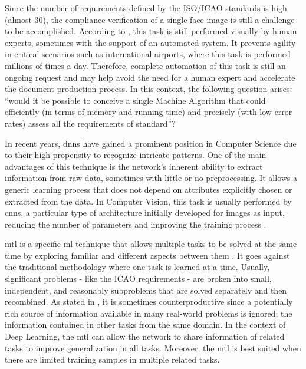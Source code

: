 Since the number of requirements defined by the ISO/ICAO standards is high (almost 30), the compliance verification of a single face image is still a challenge to be accomplished. According to \cite{ferrara2012multi}, this task is still performed visually by human experts, sometimes with the support of an automated system. It prevents agility in critical scenarios such as international airports, where this task is performed millions of times a day. Therefore, complete automation of this task is still an ongoing request and may help avoid the need for a human expert and accelerate the document production process. In this context, the following question arises: ``would it be possible to conceive a single Machine Algorithm that could efficiently (in terms of memory and running time) and precisely (with low error rates) assess all the requirements of \icao standard''?

In recent years, \acfp{dnn} have gained a prominent position in Computer Science due to their high propensity to recognize intricate patterns. One of the main advantages of this technique is the network's inherent ability to extract information from raw data, sometimes with little or no preprocessing. It allows a generic learning process that does not depend on attributes explicitly chosen or extracted from the data. In Computer Vision, this task is usually performed by \acfp{cnn}, a particular type of architecture initially developed for images as input, reducing the number of parameters and improving the training process \citep{goodfellow2016deep}.

\acf{mtl} is a specific \acl{ml} technique that allows multiple tasks to be solved at the same time by exploring familiar and different aspects between them \citep{zhang2017survey}. It goes against the traditional methodology where one task is learned at a time. Usually, significant problems - like the ICAO requirements - are broken into small, independent, and reasonably subproblems that are solved separately and then recombined. As stated in \cite{Caruana1997}, it is sometimes counterproductive since a potentially rich source of information available in many real-world problems is ignored: the information contained in other tasks from the same domain. In the context of Deep Learning, the \acs{mtl} can allow the network to share information of related tasks to improve generalization in all tasks. Moreover, the \acl{mtl} is best suited when there are limited training samples in multiple related tasks.

